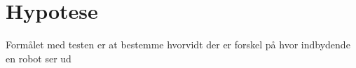 \section*{Hypotese}
\label{Hypotese}
%
Formålet med testen er at bestemme hvorvidt der er forskel på hvor indbydende en robot ser ud 
